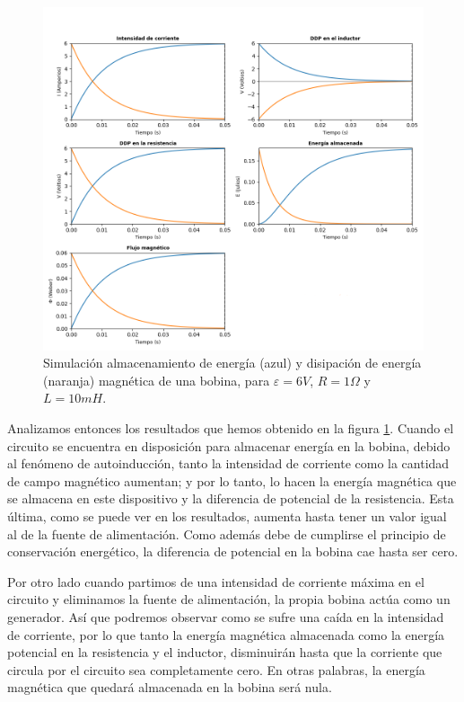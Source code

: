 \documentclass[../main.tex]{subfiles}
\begin{document}
\begin{figure}[!h]
    \centering
    \includegraphics[width=\textwidth]{images/resultados_ejemplo_circuitoRL.png}
    \caption{Simulación almacenamiento de energía (azul) y disipación de energía (naranja) magnética de una bobina, para $\varepsilon=6V$, $R=1 \Omega$ y $L=10 mH$.}
    \label{fig::sim_ejemplo_rl}
\end{figure}


Analizamos entonces los resultados que hemos obtenido en la figura \ref{fig::sim_ejemplo_rl}. Cuando el circuito se encuentra en disposición para almacenar energía en la bobina, debido al fenómeno de autoinducción, tanto la intensidad de corriente como la cantidad de campo magnético aumentan; y por lo tanto, lo hacen la energía magnética que se almacena en este dispositivo y la diferencia de potencial de la resistencia. Esta última, como se puede ver en los resultados, aumenta hasta tener un valor igual al de la fuente de alimentación. Como además debe de cumplirse el principio de conservación energético, la diferencia de potencial en la bobina cae hasta ser cero. 

Por otro lado cuando partimos de una intensidad de corriente máxima en el circuito y eliminamos la fuente de alimentación, la propia bobina actúa como un generador. Así que podremos observar como se sufre una caída en la intensidad de corriente, por lo que tanto la energía magnética almacenada como la energía potencial en la resistencia y el inductor, disminuirán hasta que la corriente que circula por el circuito sea completamente cero. En otras palabras, la energía magnética que quedará almacenada en la bobina será nula.
\end{document}
